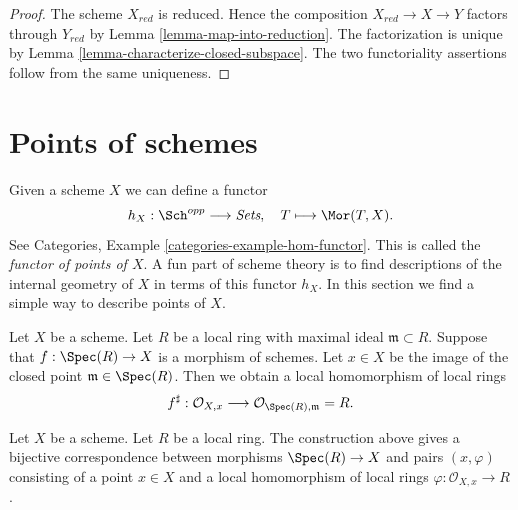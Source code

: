 \begin{proof}
The scheme $X_{red}$ is reduced. Hence the composition
$X_{red} \to X \to Y$ factors through $Y_{red}$ by
Lemma \ref{lemma-map-into-reduction}. The factorization is unique by
Lemma \ref{lemma-characterize-closed-subspace}. The two functoriality
assertions follow from the same uniqueness.
\end{proof}










\section{Points of schemes}
\label{section-points}

\noindent
Given a scheme $X$ we can define a functor
$$
h_X : \Sch^{opp}
\longrightarrow
\textit{Sets}, \quad
T \longmapsto \Mor(T, X).
$$
See Categories, Example \ref{categories-example-hom-functor}.
This is called the {\it functor of points of $X$}.
A fun part of scheme theory is to find descriptions of
the internal geometry of $X$ in terms of this functor $h_X$.
In this section we find a simple way to describe
points of $X$.

\medskip\noindent
Let $X$ be a scheme. Let $R$ be a local ring with maximal ideal
$\mathfrak m \subset R$. Suppose that $f : \Spec(R) \to X$
is a morphism of schemes. Let $x \in X$ be the image of the closed point
$\mathfrak m \in \Spec(R)$. Then we obtain a local homomorphism
of local rings
$$
f^\sharp :
\mathcal{O}_{X, x}
\longrightarrow
\mathcal{O}_{\Spec(R), \mathfrak m} = R.
$$

\begin{lemma}
\label{lemma-morphism-from-spec-local-ring}
Let $X$ be a scheme. Let $R$ be a local ring.
The construction above gives a bijective correspondence
between morphisms $\Spec(R) \to X$ and pairs
$(x, \varphi)$ consisting of a point $x \in X$ and
a local homomorphism of local rings $\varphi : \mathcal{O}_{X, x} \to R$.
\end{lemma}

